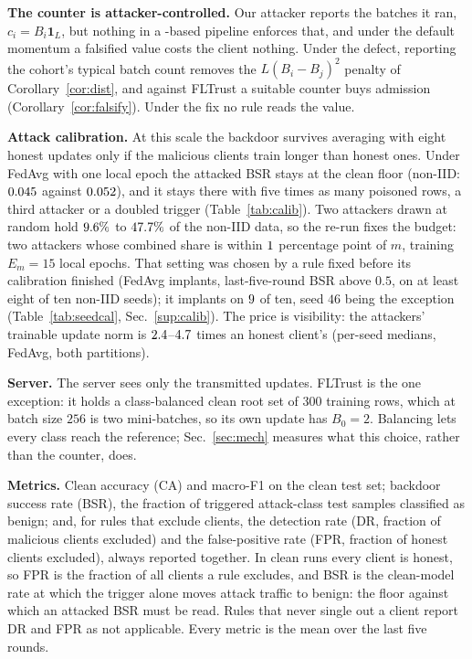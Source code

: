 \documentclass[journal]{IEEEtran}
\begin{document}
\textbf{The counter is attacker-controlled.} Our attacker reports the batches it
ran, $c_i=B_i\mathbf{1}_L$, but nothing in a \sd{}-based pipeline enforces that,
and under the default momentum a falsified value costs the client nothing.
Under the defect, reporting the cohort's typical batch count removes the
$L(B_i-B_j)^2$ penalty of Corollary~\ref{cor:dist}, and against FLTrust a suitable
counter buys admission (Corollary~\ref{cor:falsify}). Under the fix no rule reads
the value.

\textbf{Attack calibration.} At this scale the backdoor survives averaging with
eight honest updates only if the malicious clients train longer than honest ones.
Under FedAvg with one local epoch the attacked BSR stays at the clean floor
(non-IID: $0.045$ against $0.052$), and it stays there with five times
as many poisoned rows, a third attacker or a doubled trigger
(Table~\ref{tab:calib}). Two attackers drawn at random hold $9.6\%$ to
$47.7\%$ of the non-IID data, so the re-run fixes the budget: two attackers whose combined share is within
$1$ percentage point of $m$, training $E_m=15$ local epochs. That setting was chosen by a rule
fixed before its calibration finished (FedAvg implants, last-five-round BSR above
$0.5$, on at least eight of ten non-IID seeds); it implants on
$9$ of ten, seed $46$ being the exception
(Table~\ref{tab:seedcal}, Sec.~\ref{sup:calib}). The price is visibility: the attackers' trainable update
norm is $2.4$--$4.7$ times an honest client's
(per-seed medians, FedAvg, both partitions).

\textbf{Server.} The server sees only the transmitted updates. FLTrust is the one
exception: it holds a class-balanced clean root set of $300$ training rows, which
at batch size $256$ is two mini-batches, so its own update has $B_0=2$.
Balancing lets every class reach the reference; Sec.~\ref{sec:mech} measures
what this choice, rather than the counter, does.

\textbf{Metrics.} Clean accuracy (CA) and macro-F1 on the clean test set;
backdoor success rate (BSR), the fraction of triggered attack-class test samples
classified as benign; and, for rules that exclude clients, the detection rate (DR,
fraction of malicious clients excluded) and the false-positive rate (FPR, fraction
of honest clients excluded), always reported together. In clean runs every client
is honest, so FPR is the fraction of all clients a rule excludes, and BSR is the
clean-model rate at which the trigger alone moves attack traffic to benign: the
floor against which an attacked BSR must be read. Rules that never single out a
client report DR and FPR as not applicable. Every metric is the mean over the
last five rounds.
\end{document}
